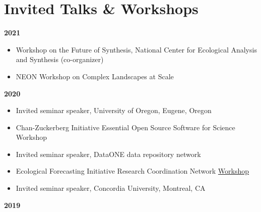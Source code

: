 \documentclass[10pt,sans]{moderncv}        %
\providecommand{\tightlist}{%
    \setlength{\itemsep}{0pt}\setlength{\parskip}{0pt}}
\begin{document}
\hypertarget{invited-talks-workshops}{%
\section{Invited Talks \& Workshops}\label{invited-talks-workshops}}

\textbf{2021}

\begin{itemize}
\tightlist
\item
  Workshop on the Future of Synthesis, National Center for Ecological
  Analysis and Synthesis (co-organizer)
\item
  NEON Workshop on Complex Landscapes at Scale
\end{itemize}

\textbf{2020}

\begin{itemize}
\tightlist
\item
  Invited seminar speaker, University of Oregon, Eugene, Oregon
\item
  Chan-Zuckerberg Initiative Essential Open Source Software for Science
  Workshop
\item
  Invited seminar speaker, DataONE data repository network
\item
  Ecological Forecasting Initiative Research Coordination Network
  \href{https://ecoforecast.org/efi-rcn-2020-workshop-videos/}{Workshop}
\item
  Invited seminar speaker, Concordia University, Montreal, CA
\end{itemize}

\textbf{2019}
\end{document}
